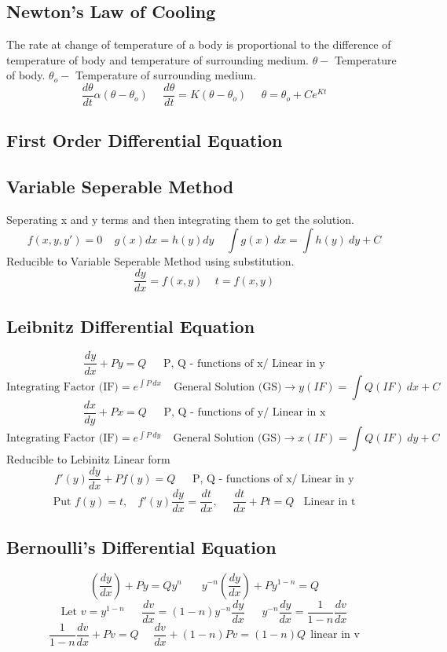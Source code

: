 \subsection*{Newton's Law of Cooling}
The rate at change of temperature of a body is proportional to the difference of temperature of body and temperature of surrounding medium. \(\theta-\) Temperature of body. \(\theta_o-\) Temperature of surrounding medium.
\[\frac{d\theta}{dt}\alpha(\theta-\theta_o)\ \ \ \ \ \ \frac{d\theta}{dt}=K(\theta-\theta_o) \ \ \ \ \ \ \theta=\theta_o+Ce^{Kt}\]


\subsection{First Order Differential Equation}
\subsection*{Variable Seperable Method}
Seperating x and y terms and then integrating them to get the solution.
\[f(x, y, y')=0\ \ \ \ \ g(x)dx=h(y)dy\ \ \ \ \ \int g(x)\ dx=\int h(y)\ dy + C\]
Reducible to Variable Seperable Method using substitution.
\[\frac{dy}{dx}=f(x,y)\ \ \ \ \ t=f(x,y)\]

\subsection*{Leibnitz Differential Equation}
\[\frac{dy}{dx}+Py=Q\ \ \ \ \ \ \ \text{P, Q - functions of x/ Linear in y}\]
\[\text{Integrating Factor (IF)}=e^{\int P\ dx} \ \ \ \ \ \text{General Solution (GS)} \rightarrow
y(IF)=\int Q(IF)\ dx + C\]
\[\frac{dx}{dy}+Px=Q\ \ \ \ \ \ \ \text{P, Q - functions of y/ Linear in x}\]
\[\text{Integrating Factor (IF)}=e^{\int P\ dy} \ \ \ \ \ \text{General Solution (GS)} \rightarrow
x(IF)=\int Q(IF)\ dy + C\]
Reducible to Lebinitz Linear form
\[f'(y)\frac{dy}{dx}+Pf(y)=Q\ \ \ \ \ \ \ \text{P, Q - functions of x/ Linear in y}\]
\[\text{Put } f(y)=t,\ \ \ \ f'(y)\frac{dy}{dx}=\frac{dt}{dx},\ \ \ \ \ \ \frac{dt}{dx} + Pt=Q\ \ \ \ \text{Linear in t}\]

\subsection*{Bernoulli's Differential Equation}
\[\left(\frac{dy}{dx}\right)+ Py = Qy^n\ \ \ \ \ \ \ \ y^{-n}\left(\frac{dy}{dx}\right)+Py^{1-n}=Q \]
\[\text{Let }v=y^{1-n}\ \ \ \ \ \ \ \frac{dv}{dx}=(1-n)y^{-n}\frac{dy}{dx}\ \ \ \ \ \ \ 
y^{-n}\frac{dy}{dx}=\frac{1}{1-n}\frac{dv}{dx}\]
\[\frac{1}{1-n}\frac{dv}{dx}+Pv=Q\ \ \ \ \ \ \frac{dv}{dx}+(1-n)Pv=(1-n)Q \ \ \text{linear in v}\]


